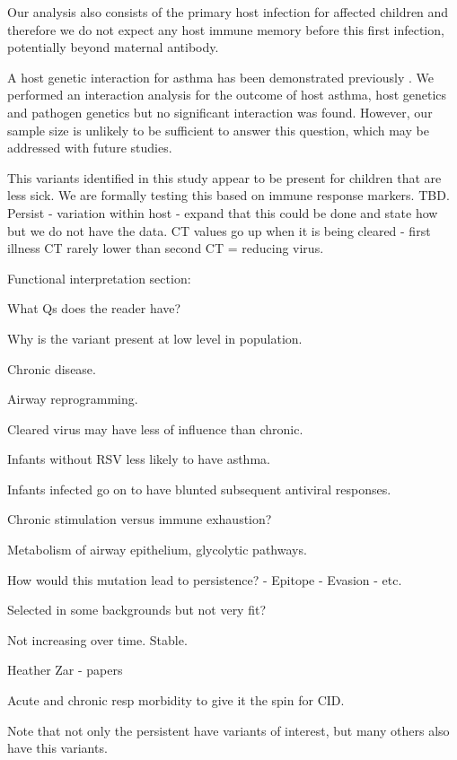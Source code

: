 \documentclass{article}
\begin{document}
Our analysis also consists of the primary host infection for affected children and therefore we do not expect any host immune memory before this first infection, potentially beyond maternal antibody.

A host genetic interaction for asthma has been demonstrated previously 
\cite{moffatt2010large}.
We performed an interaction analysis for the outcome of host asthma, 
host genetics and pathogen genetics 
but no significant interaction was found. 
However, our sample size is unlikely to be sufficient to answer this question, 
which may be addressed with future studies. 

This variants identified in this study appear to be present for children that are less sick.
We are formally testing this based on immune response markers. TBD.
Persist - variation within host - expand that this could be done and state how but we do not have the data. 
CT values go up when it is being cleared  - first illness CT rarely lower than second CT = reducing virus.

Functional interpretation section:
\begin{description}[noitemsep]
\item What Qs does the reader have?
\item Why is the variant present at low level in population. 
\item Chronic disease.
\item Airway reprogramming.
\item Cleared virus may have less of influence than chronic.
\item Infants without RSV less likely to have asthma.
\item Infants infected go on to have blunted subsequent antiviral responses.
\item Chronic stimulation versus immune exhaustion?
\item Metabolism of airway epithelium, glycolytic pathways.
\item How would this mutation lead to persistence? 
	- Epitope
	- Evasion
	- etc.
\item Selected in some backgrounds but not very fit?
\item Not increasing over time. Stable.
\item Heather Zar - papers
\item Acute and chronic resp morbidity to give it the spin for CID.
	\item Note that not only the persistent have variants of interest, but many others also have this variants. 
\end{description}
\end{document}
